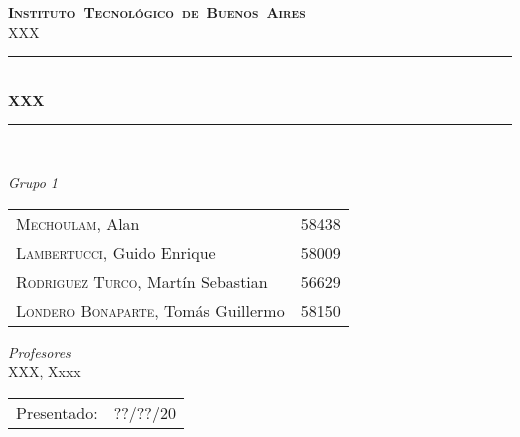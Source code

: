 \begin{titlepage}
\newcommand{\HRule}{\rule{\linewidth}{0.5mm}}
\center
\mbox{\textsc{\LARGE \bfseries {Instituto Tecnológico de Buenos Aires}}}\\[1.5cm]
\textsc{\Large XXX}\\[0.5cm]


\HRule \\[0.6cm]
{ \Huge \bfseries XXX}\\[0.4cm] 
\HRule \\[1.5cm]


{\large

\emph{Grupo 1}\\
\vspace{3px}

\begin{tabular}{lr} 	
\textsc{Mechoulam}, Alan  &  58438\\
\textsc{Lambertucci}, Guido Enrique  & 58009 \\
\textsc{Rodriguez Turco}, Martín Sebastian  & 56629 \\
\textsc{Londero Bonaparte}, Tomás Guillermo  & 58150 \\
\end{tabular}

\vspace{20px}

\emph{Profesores}\\
XXX, Xxxx\\



\vspace{3px}

\vspace{100px}

\begin{tabular}{ll}

Presentado: & ??/??/20\\

\end{tabular}

}

\vfill

\end{titlepage}
